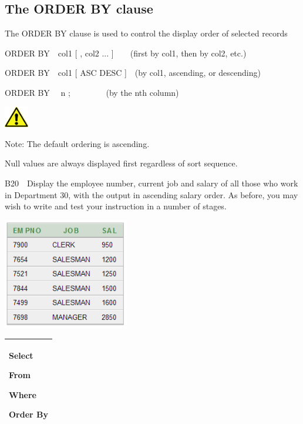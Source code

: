 \subsection[The ORDER BY clause]{The ORDER BY clause}
The ORDER BY clause is used to control the display order of selected records

ORDER BY\ \ col1 [ , col2 ... ]\ \ \ \ (first by col1, then by col2, etc.)

ORDER BY\ \ col1  [ ASC {\textbar} DESC ]\ \ (by col1, ascending, or descending)

ORDER BY \ \ n ; \ \ \ \ \ \ \ \ (by the nth column)



\begin{center}
  
\includegraphics[width=1.076cm,height=0.917cm]{images/img (2).png}

\end{center}
Note: The default ordering is ascending.

Null values are always displayed first regardless of sort sequence.

B20\ \ Display the employee number, current job and salary of all those who work in Department 30, with the output in ascending salary order.  As before, you may wish to write and test your instruction in a number of stages.



\begin{center}
  
\includegraphics[width=5.514cm,height=4.835cm]{images/img (29).png}

\end{center}
\begin{flushleft}
\tablefirsthead{}
\tablehead{}
\tabletail{}
\tablelasttail{}
\begin{supertabular}{|m{9.482cm}|}
\hline
Select 

From

Where

Order By\\\hline
\end{supertabular}
\end{flushleft}


